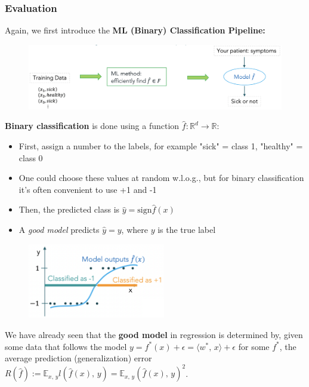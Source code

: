 \documentclass[a4paper]{extarticle}
\begin{document}
\subsubsection{Evaluation}

Again, we first introduce the \textbf{ML (Binary) Classification Pipeline:}

\begin{figure}[H]
    \includegraphics[width=15cm]{../images/IntroML_Fig4-1}
    \centering
\end{figure}

\textbf{Binary classification} is done using a function \(\hat{f} : \mathbb{R}^d \to \mathbb{R}\):

\begin{itemize}
    \item First, assign a number to the labels, for example "sick" = class 1, "healthy" = class 0
    \item One could choose these values at random w.l.o.g., but for binary classification it's often convenient to use +1 and -1
    \item Then, the predicted class is \(\hat{y} = \text{sign} \hat{f}(x)\)
    \item A \textit{good model} predicts \(\hat{y} = y\), where \(y\) is the true label
\end{itemize}

\begin{figure}[H]
    \includegraphics[width=6cm]{../images/IntroML_Fig4-2}
    \centering
\end{figure}

We have already seen that the \textbf{good model} in regression is determined by, given some data that follows the model \(y = f^*(x) + \epsilon = \langle w^*, \, x \rangle + \epsilon\) for some \(f^*\), the average prediction (generalization) error \(R(\hat{f}) := \mathbb{E}_{x, \, y}l(\hat{f}(x), \, y) = \mathbb{E}_{x, \, y}(\hat{f}(x), \, y)^2\).
\end{document}
